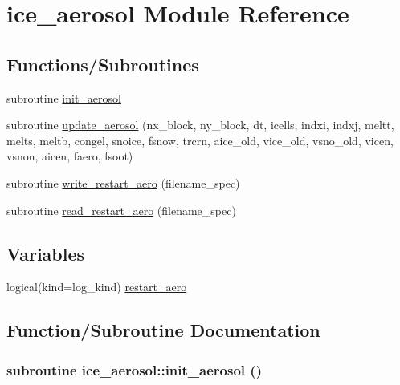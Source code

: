 \hypertarget{namespaceice__aerosol}{
\section{ice\_\-aerosol Module Reference}
\label{namespaceice__aerosol}
}
\subsection*{Functions/Subroutines}
\begin{DoxyCompactItemize}
\item 
subroutine \hyperlink{namespaceice__aerosol_aa513eb52e19fad1dae05441487607b63}{init\_\-aerosol}
\item 
subroutine \hyperlink{namespaceice__aerosol_a11451c6ed657ce27ffdd01d6c3db0ed4}{update\_\-aerosol} (nx\_\-block, ny\_\-block, dt, icells, indxi, indxj, meltt, melts, meltb, congel, snoice, fsnow, trcrn, aice\_\-old, vice\_\-old, vsno\_\-old, vicen, vsnon, aicen, faero, fsoot)
\item 
subroutine \hyperlink{namespaceice__aerosol_a1e014a016b35aba5d5f31a829ffa909f}{write\_\-restart\_\-aero} (filename\_\-spec)
\item 
subroutine \hyperlink{namespaceice__aerosol_a423573cf8f7630b777b38860c81adfb0}{read\_\-restart\_\-aero} (filename\_\-spec)
\end{DoxyCompactItemize}
\subsection*{Variables}
\begin{DoxyCompactItemize}
\item 
logical(kind=log\_\-kind) \hyperlink{namespaceice__aerosol_a3ceb80d852249f318373d31d28ce9007}{restart\_\-aero}
\end{DoxyCompactItemize}


\subsection{Function/Subroutine Documentation}
\hypertarget{namespaceice__aerosol_aa513eb52e19fad1dae05441487607b63}{
\subsubsection[{init\_\-aerosol}]{\setlength{\rightskip}{0pt plus 5cm}subroutine ice\_\-aerosol::init\_\-aerosol ()}}
\label{namespaceice__aerosol_aa513eb52e19fad1dae05441487607b63}


